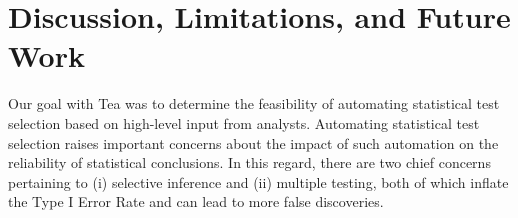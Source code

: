











\section{Discussion, Limitations, and Future Work} \label{sec:discussionTea} 

Our goal with Tea was to determine the feasibility of automating statistical
test selection based on high-level input from analysts. Automating statistical
test selection raises important concerns about the impact of such automation on
the reliability of statistical conclusions. In this regard, there are two chief
concerns pertaining to (i) selective inference and (ii) multiple testing, both
of which inflate the Type I Error Rate and can lead to more false discoveries. 

